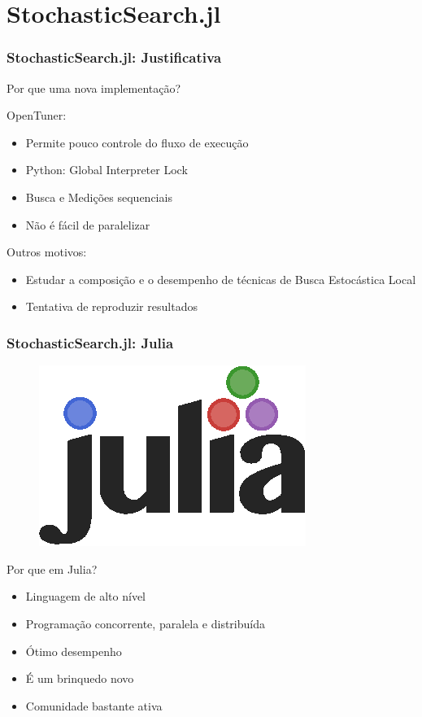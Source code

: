 \documentclass[10pt, compress]{beamer}
\begin{document}
\section{StochasticSearch.jl}

\begin{frame}[fragile]
    \frametitle{StochasticSearch.jl: Justificativa}
    Por que uma nova implementação?

    OpenTuner:
    \begin{itemize}
        \item Permite \alert{pouco controle} do fluxo de execução
        \item Python: \alert{Global Interpreter Lock}
        \item Busca e Medições \alert{sequenciais}
        \item Não é fácil de \alert{paralelizar}
    \end{itemize}
    Outros motivos:
    \begin{itemize}
        \item Estudar a \alert{composição} e o \alert{desempenho} de técnicas
            de Busca Estocástica Local
        \item Tentativa de \alert{reproduzir} resultados
    \end{itemize}
\end{frame}

\begin{frame}[fragile]
    \frametitle{StochasticSearch.jl: Julia}
    \begin{figure}[H]
        \centering
        \includegraphics[width=.24\textwidth]{julialogo}
    \end{figure}%
    Por que em Julia?
    \begin{itemize}
        \item Linguagem de \alert{alto nível}
        \item Programação \alert{concorrente}, \alert{paralela} e \alert{distribuída}
        \item Ótimo \alert{desempenho}
        \item É um brinquedo \alert{novo}
        \item Comunidade bastante \alert{ativa}
    \end{itemize}
    \let\thefootnote\relax{}
\end{frame}
\end{document}
